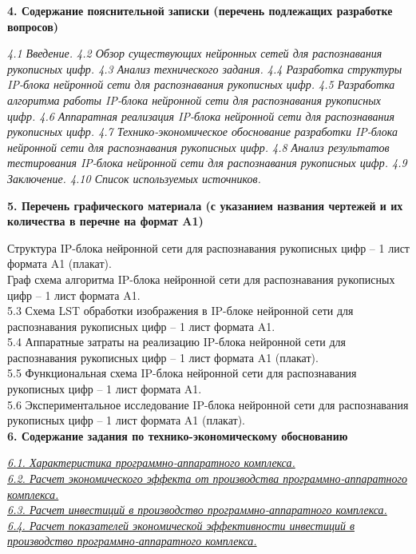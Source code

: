 \noindent
\textbf{4. Содержание пояснительной записки (перечень подлежащих разработке вопросов)}

\noindent
\textit{4.1 Введение.
4.2 Обзор существующих нейронных сетей для распознавания рукописных цифр.
4.3 Анализ технического задания.
4.4 Разработка структуры IP-блока нейронной сети для распознавания рукописных цифр.
4.5 Разработка алгоритма работы IP-блока нейронной сети для распознавания рукописных цифр.
4.6 Аппаратная реализация IP-блока нейронной сети для распознавания рукописных цифр.
4.7 Технико-экономическое обоснование разработки IP-блока нейронной сети для распознавания рукописных цифр.
4.8 Анализ результатов тестирования IP-блока нейронной сети для распознавания рукописных цифр.
4.9 Заключение.
4.10 Список используемых источников.}

\vspace{1em}

\noindent
\textbf{5. Перечень графического материала (с указанием названия чертежей и их количества в перечне на формат A1)}

\vspace{0.3em}
 Структура IP-блока нейронной сети для распознавания рукописных цифр – 1 лист формата A1 (плакат).\\
\clearpage
\thispagestyle{empty}
 Граф схема алгоритма IP-блока нейронной сети для распознавания рукописных цифр – 1 лист формата A1.\\
5.3 Схема LST обработки изображения в IP-блоке нейронной сети для распознавания рукописных цифр – 1 лист формата A1.\\
5.4 Аппаратные затраты на реализацию IP-блока нейронной сети для распознавания рукописных цифр – 1 лист формата A1 (плакат).\\
5.5 Функциональная схема IP-блока нейронной сети для распознавания рукописных цифр – 1 лист формата A1.\\
5.6 Экспериментальное исследование IP-блока нейронной сети для распознавания рукописных цифр – 1 лист формата A1 (плакат).\\

\noindent
\textbf{6. Содержание задания по технико-экономическому обоснованию}

\noindent
\uline{\textit{6.1. Характеристика программно-аппаратного комплекса.\hspace{5.8cm}}}\\[0.3em]
\textit{\uline{6.2. Расчет экономического эффекта от производства программно-аппаратного комплекса.\hspace{14.5cm}}}\\[0.3em]
\textit{\uline{6.3. Расчет инвестиций в производство программно-аппаратного комплекса.\hspace{2.6cm}}}\\[0.3em]
\textit{\uline{6.4. Расчет показателей экономической эффективности инвестиций в производство программно-аппаратного комплекса.\hspace{9.75cm}}}

